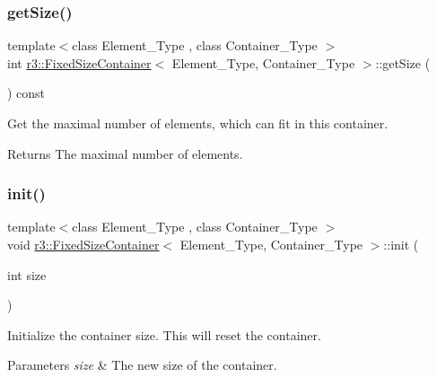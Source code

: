 \subsubsection{\texorpdfstring{get\+Size()}{getSize()}}
{\footnotesize\ttfamily template$<$class Element\+\_\+\+Type , class Container\+\_\+\+Type $>$ \\
int \mbox{\hyperlink{classr3_1_1_fixed_size_container}{r3\+::\+Fixed\+Size\+Container}}$<$ Element\+\_\+\+Type, Container\+\_\+\+Type $>$\+::get\+Size (\begin{DoxyParamCaption}{ }\end{DoxyParamCaption}) const}



Get the maximal number of elements, which can fit in this container. 

\begin{DoxyReturn}{Returns}
The maximal number of elements. 
\end{DoxyReturn}
\mbox{\label{classr3_1_1_fixed_size_container_a75dddd29ba901e97ba6133a6c388b357}} 
\subsubsection{\texorpdfstring{init()}{init()}}
{\footnotesize\ttfamily template$<$class Element\+\_\+\+Type , class Container\+\_\+\+Type $>$ \\
void \mbox{\hyperlink{classr3_1_1_fixed_size_container}{r3\+::\+Fixed\+Size\+Container}}$<$ Element\+\_\+\+Type, Container\+\_\+\+Type $>$\+::init (\begin{DoxyParamCaption}\item[{int}]{size }\end{DoxyParamCaption})}



Initialize the container size. This will reset the container. 


\begin{DoxyParams}{Parameters}
{\em size} & The new size of the container. \\
\hline
\end{DoxyParams}
\mbox{\label{classr3_1_1_fixed_size_container_adde8deee5146abd862ef32e1ac3bb879}} 
